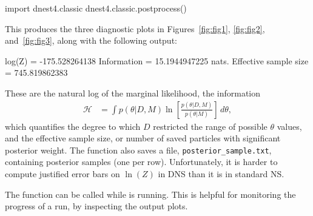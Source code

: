 \documentclass[article]{jss}
\begin{document}
\begin{CodeChunk}
\begin{CodeInput}
import dnest4.classic
dnest4.classic.postprocess()
\end{CodeInput}
\end{CodeChunk}
This produces the three diagnostic plots in Figures~\ref{fig:fig1},
\ref{fig:fig2}, and~\ref{fig:fig3}, along with the following output:
\begin{CodeChunk}
\begin{CodeOutput}
log(Z) = -175.528264138
Information = 15.1944947225 nats.
Effective sample size = 745.819862383
\end{CodeOutput}
\end{CodeChunk}
These are the natural log of the marginal likelihood, the
information
\begin{align}
\mathcal{H} &= \int p(\theta|D, M)
\ln\left[\frac{p(\theta | D, M)}{p(\theta | M)}\right] \, d\theta,
\end{align}
which quantifies the degree to which $D$ restricted the
range of possible $\theta$ values,
and the effective sample size,
or number of saved particles with significant posterior weight.
The  function also saves a file,
{\tt posterior\_sample.txt}, containing posterior samples (one per row).
Unfortunately, it is harder to compute justified error bars on $\ln(Z)$
in DNS than it is in standard NS.

The  function can be called while  is running.
This is helpful for monitoring the progress of a run, by inspecting the
output plots.
\end{document}
